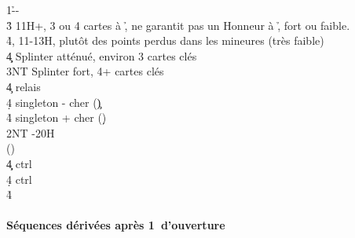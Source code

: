 \documentclass[a4paper]{article}
\begin{document}
\begin{bidtable}
1\h--\\
3\h \> 11H+, 3 ou 4 cartes à \h , ne garantit pas un Honneur à \h , fort ou faible.\\
4\h {}, 11-13H, plutôt des points perdus dans les mineures (très faible)\\
4\c\d \> Splinter atténué, environ 3 cartes clés\\
3NT \> Splinter fort, 4+ cartes clés\+\\
4\c \> relais\+\\
4\d \> singleton - cher (\c )\\
4\h \> singleton + cher (\d )\-\-\\
2NT -20H\+\\
()\+\\
4\c\d {} ctrl \c \\
4\d {} ctrl \d \\
4\h {}\-\-
\end{bidtable}

\paragraph{Séquences dérivées après 1\pdfh\ d’ouverture}
\end{document}
